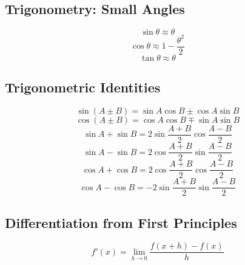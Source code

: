     \subsection{Trigonometry: Small Angles}
        \begin{equation} \label{sine_small_angle}
            \sin\theta\approx\theta
        \end{equation}
        \begin{equation} \label{cosine_small_angle}
            \cos\theta\approx1-\frac{\theta^2}{2}
        \end{equation}
        \begin{equation} \label{tangent_small_angle}
            \tan\theta\approx\theta
        \end{equation}

    \subsection{Trigonometric Identities}
        \begin{equation} \label{sine_compound_angle_formula}
            \sin(A\pm B)=\sin A\cos B\pm\cos A\sin B
        \end{equation}
        \begin{equation} \label{cosine_compound_angle_formula}
            \cos(A\pm B)=\cos A\cos B\mp\sin A\sin B
        \end{equation}
        \begin{equation} \label{sine_addition_formula}
            \sin A+\sin B=2\sin{\frac{A+B}{2}}\cos{\frac{A-B}{2}}
        \end{equation}
        \begin{equation} \label{sine_subtraction_formula}
            \sin A-\sin B=2\cos{\frac{A+B}{2}}\sin{\frac{A-B}{2}}
        \end{equation}
        \begin{equation} \label{cosine_addition_formula}
            \cos A+\cos B=2\cos{\frac{A+B}{2}}\cos{\frac{A-B}{2}}
        \end{equation}
        \begin{equation} \label{cosine_subtraction_formula}
            \cos A-\cos B=-2\sin{\frac{A+B}{2}}\sin{\frac{A-B}{2}}
        \end{equation}

    \subsection{Differentiation from First Principles}
        \begin{equation}
            f'(x)=\lim_{h\to0}\frac{f(x+h)-f(x)}{h}
        \end{equation}

